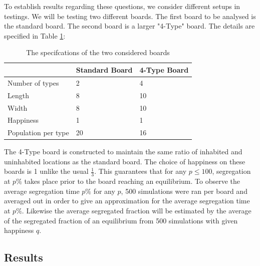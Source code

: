 To establish results regarding these questions, we consider different setups in testings. We will be testing two different boards.
The first board to be analysed is the standard board. The second board is a larger 
"4-Type" board. The details are specified in Table \ref{tab:specs}:
\begin{table}[h!]
\centering
\caption{The specifcations of the two considered boards}
\label{tab:specs}
\begin{tabular}{l|l|l}
  & Standard Board & 4-Type Board\\ \hline
Number of types & 2 & 4 \\ 
 Length & 8 & 10  \\
 Width & 8 & 10  \\
 Happiness & 1 & 1  \\
Population per type & 20 & 16  
\end{tabular}
\end{table}

The 4-Type board is constructed to maintain the same ratio of inhabited and uninhabited locations as the standard board. The choice of happiness on these boards is 1 unlike the usual \(\frac{1}{3}\). 
This guarantees that for any \(p\leq 100\), segregation at \(p\%\) takes place prior to the board reaching an equilibrium. 
To observe the average segregation time \(p\%\) for any \(p\), 500 simulations were ran per board and averaged out in order to give an approximation for the average segregation time at \(p\%\).
Likewise the average segregated fraction will be estimated by the average of the segregated fraction of an equilibrium from 500 simulations with given happiness \(q\).

\subsection{Results}

